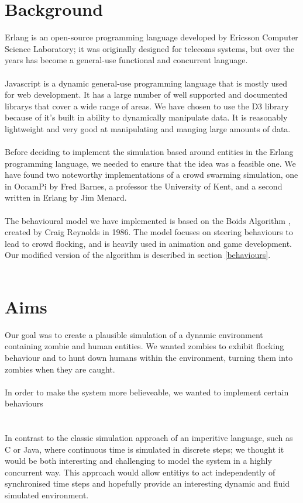 \documentclass[10pt, a4paper, conference, compsocconf]{IEEEtran}
\begin{document}
\section{Background \label{background}}
Erlang is an open-source programming language developed by Ericsson Computer Science Laboratory; it was originally designed for telecoms systems, but over the years has become a general-use functional and concurrent language.\\
\\
Javascript is a dynamic general-use programming language that is mostly used for web development. It has a large number of well supported and documented librarys that cover a wide range of areas. We have chosen to use the D3\cite{d3} library because of it's built in ability to dynamically manipulate data. It is reasonably lightweight and very good at manipulating and manging large amounts of data.\\
\\
Before deciding to implement the simulation based around entities in the Erlang programming language, we needed to ensure that the idea was a feasible one. We have found two noteworthy implementations of a crowd swarming simulation, one in OccamPi by Fred Barnes\cite{occam_boids}, a professor the University of Kent, and a second written in Erlang by Jim Menard\cite{erlang_boids}.\\
\\
The behavioural model we have implemented is based on the Boids Algorithm \cite{boids}, created by Craig Reynolds in 1986. The model focuses on steering behaviours to lead to crowd flocking, and is heavily used in animation and game development. Our modified version of the algorithm is described in section \ref{behaviours}.\\
\\
\section{Aims \label{aims}}
Our goal was to create a plausible simulation of a dynamic environment containing zombie and human entities. We wanted zombies to exhibit flocking behaviour and to hunt down humans within the environment, turning them into zombies when they are caught. \\
\\
In order to make the system more believeable, we wanted to implement certain behaviours
\\
\\
\\
In contrast to the classic simulation approach of an imperitive language, such as C or Java, where continuous time is simulated in discrete steps; we thought it would be both interesting and challenging to model the system in a highly concurrent way. This approach would allow entitiys to act independently of synchronised time steps and hopefully provide an interesting dynamic and fluid simulated environment.\\
\\
\end{document}
